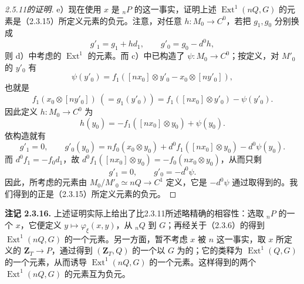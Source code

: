 \begin{proof}[2.5.11的证明]
 e）现在使用 $x$ 是 ${}_nP$ 的这一事实，证明上述 $\operatorname{Ext}^1(nQ,G)$ 的元素是（2.3.15）所定义元素的负元。注意，对任意 $h:M_0\longrightarrow C^0$，若把 $g_1,g_0$ 分别换成
\[g'_1=g_1+hd_1,\qquad g'_0=g_0-d^0h,\]
则 d）中考虑的 $\operatorname{Ext}^1$ 的元素。而 c）中已构造了 $\psi:M_0\longrightarrow C^0$；按定义，对 $M'_0$ 的 $y'_0$ 有
\[\psi(y'_0)=f_1([nx_0]\otimes y'_0-x_0\otimes[ny'_0]),\]
也就是
\[f_1(x_0\otimes[ny'_0])\ (=g_1(y'_0))
=f_1([nx_0]\otimes y'_0)-\psi(y'_0).\]
因此定义 $h:M_0\longrightarrow C^0$ 为
\[h(y_0)=-f_1([nx_0]\otimes y_0)+\psi(y_0).\]
依构造就有
\[g'_1=0,\qquad g'_0(y_0)=nf_0(x_0\otimes y_0)+d^0f_1([nx_0]\otimes y_0)-d^0\psi(y_0).\]
而 $d^0f_1=-f_0d_1$，故 $d^0f_1([nx_0]\otimes y_0)=-f_0(nx_0\otimes y_0)$，从而只剩
\[g'_1=0,\qquad g'_0=-d^0\psi.\]
因此，所考虑的元素由 $M_0/M'_0\simeq nQ\longrightarrow C^1$ 定义，它是 $-d^0\psi$ 通过取得到的。我们得到的正是（2.3.15）所定义元素的负元。
\end{proof}

\textbf{注记 2.3.16.} 上述证明实际上给出了比2.3.11所述略精确的相容性：选取 ${}_nP$ 的一个 $x$，它便定义 $y\mapsto\varphi_\xi(x,y)$，从 ${}_nQ$ 到 $G$；再经关于（2.3.6）的得到 $\operatorname{Ext}^1(nQ,G)$ 的一个元素。另一方面，暂不考虑 $x$ 被 $n$ 这一事实，取 $x$ 所定义的 $\mathbf Z_T\longrightarrow P$，通过得到 $(\mathbf Z_T,Q)$ 的一个以 $G$ 为的；它的类释为 $\operatorname{Ext}^1(Q,G)$ 的一个元素，从而诱导 $\operatorname{Ext}^1(nQ,G)$ 的一个元素。这样得到的两个 $\operatorname{Ext}^1(nQ,G)$ 的元素互为负元。

